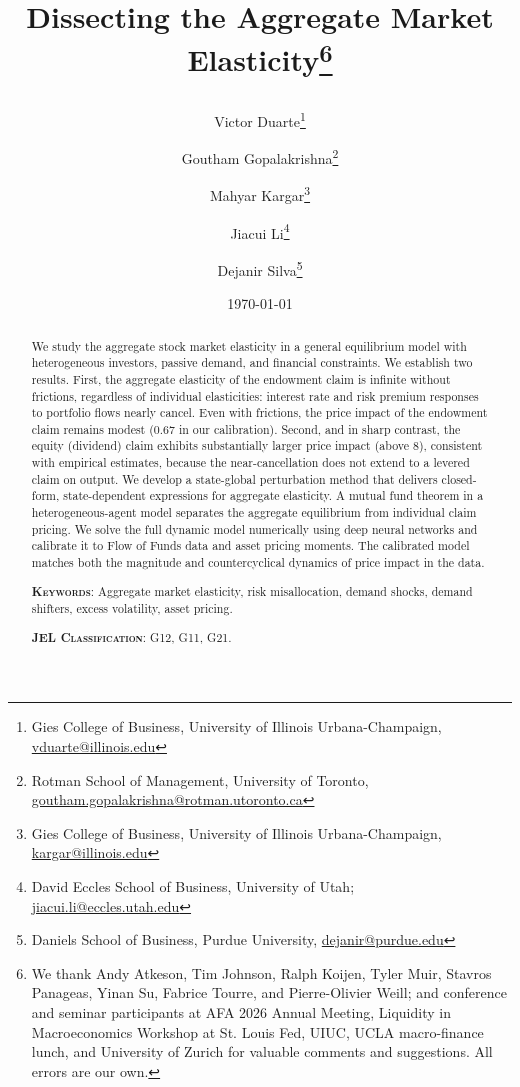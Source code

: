 \documentclass[12pt,english]{article}
\title{\textbf{Dissecting the Aggregate Market Elasticity\thanks{We thank Andy Atkeson, Tim Johnson, Ralph Koijen, Tyler Muir, Stavros Panageas, Yinan Su, Fabrice Tourre, and Pierre-Olivier Weill; and conference and seminar participants at AFA 2026 Annual Meeting, Liquidity in Macroeconomics Workshop at St. Louis Fed, UIUC, UCLA macro-finance lunch, and University of Zurich for valuable comments and suggestions. All errors are our own.}}
\author{ 
Victor Duarte\thanks{Gies College of Business, University of Illinois Urbana-Champaign, \href{mailto:vduarte@illinois.edu}{vduarte@illinois.edu}}\and 
Goutham Gopalakrishna\thanks{Rotman School of Management, University of Toronto, \href{mailto:goutham.gopalakrishna@rotman.utoronto.ca}{goutham.gopalakrishna@rotman.utoronto.ca}}\and
Mahyar Kargar\thanks{Gies College of Business, University of Illinois Urbana-Champaign, \href{mailto:kargar@illinois.edu}{kargar@illinois.edu}}\and Jiacui Li\thanks{David Eccles School of Business, University of Utah; \href{mailto:jiacui.li@eccles.utah.edu}{jiacui.li@eccles.utah.edu}} \and Dejanir Silva\thanks{Daniels School of Business, Purdue University, \href{dejanir@purdue.edu}{dejanir@purdue.edu}}}
}
\date{\today}
\begin{document}
  \sloppy
  \maketitle
  \thispagestyle{empty}
  
  \begin{abstract} 
  \noindent 
  We study the aggregate stock market elasticity in a general equilibrium model with heterogeneous investors, passive demand, and financial constraints. We establish two results. First, the aggregate elasticity of the endowment claim is infinite without frictions, regardless of individual elasticities: interest rate and risk premium responses to portfolio flows nearly cancel. Even with frictions, the price impact of the endowment claim remains modest (0.67 in our calibration). Second, and in sharp contrast, the equity (dividend) claim exhibits substantially larger price impact (above 8), consistent with empirical estimates, because the near-cancellation does not extend to a levered claim on output. We develop a state-global perturbation method that delivers closed-form, state-dependent expressions for aggregate elasticity. A mutual fund theorem in a heterogeneous-agent model separates the aggregate equilibrium from individual claim pricing. We solve the full dynamic model numerically using deep neural networks and calibrate it to Flow of Funds data and asset pricing moments. The calibrated model matches both the magnitude and countercyclical dynamics of price impact in the data.  
  \vspace{10mm} 
  \bigskip
  
  \noindent 
  \textsc{\textbf{Keywords}}: Aggregate market elasticity, risk misallocation, demand shocks, demand shifters, excess volatility, asset pricing. 
  
  \medskip
  \noindent
  \textsc{\textbf{JEL Classification}}: G12, G11, G21.   
\end{abstract}
	
\end{document}
